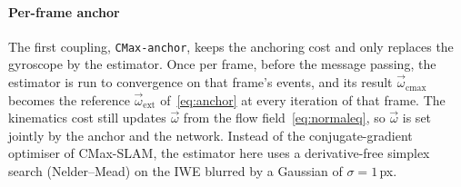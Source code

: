 \documentclass[journal]{IEEEtran}
\newcommand{\Cmat}{\mathcal{C}}
\newcommand{\wvec}{\vec{\omega}}
\begin{document}

\paragraph{Per-frame anchor}
The first coupling, \texttt{CMax-anchor}, keeps the anchoring cost and only replaces the gyroscope by the estimator. Once per frame, before the message passing, the estimator is run to convergence on that frame's events, and its result $\wvec_{\text{cmax}}$ becomes the reference $\wvec_{\text{ext}}$ of~\eqref{eq:anchor} at every iteration of that frame. The kinematics cost still updates $\wvec$ from the flow field~\eqref{eq:normaleq}, so $\wvec$ is set jointly by the anchor and the network. Instead of the conjugate-gradient optimiser of CMax-SLAM, the estimator here uses a derivative-free simplex search (Nelder--Mead) on the IWE blurred by a Gaussian of $\sigma = 1$\,px.
\end{document}
